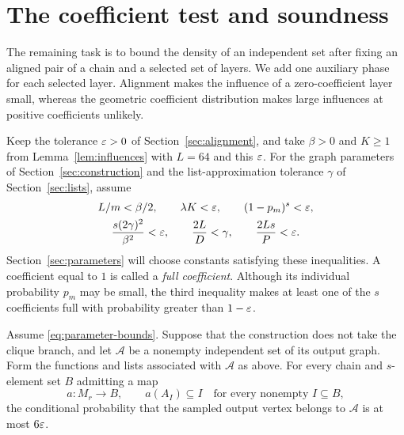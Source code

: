 \section{The coefficient test and soundness}
\label{sec:coefficient}

The remaining task is to bound the density of an independent set after
fixing an aligned pair of a chain and a selected set of layers.  We add
one auxiliary phase for each selected layer.  Alignment makes the
influence of a zero-coefficient layer small, whereas the geometric
coefficient distribution makes large influences at positive coefficients
unlikely.

Keep the tolerance $\varepsilon>0$ of Section~\ref{sec:alignment}, and take
$\beta>0$ and $K\ge1$ from
Lemma~\ref{lem:influences} with $L=64$ and this $\varepsilon$.
For the graph parameters of Section~\ref{sec:construction} and the
list-approximation tolerance $\gamma$ of Section~\ref{sec:lists}, assume
\begin{equation}\label{eq:parameter-bounds}
 \begin{gathered}
 L/m<\beta/2,\qquad \lambda K<\varepsilon,
 \qquad (1-p_m)^s<\varepsilon,\\
 \frac{s(2\gamma)^2}{\beta^2}<\varepsilon,\qquad
 \frac{2L}{D}<\gamma,\qquad \frac{2Ls}{P}<\varepsilon.
 \end{gathered}
\end{equation}
Section~\ref{sec:parameters} will choose constants satisfying these
inequalities. A coefficient equal to $1$ is called a \emph{full
coefficient}. Although its individual probability $p_m$ may be small,
the third inequality makes at least one of the $s$ coefficients full
with probability greater than $1-\varepsilon$.

\begin{proposition}\label{prop:aligned-bound}
Assume \eqref{eq:parameter-bounds}. Suppose that the construction does not
take the clique branch, and let
$\mathcal A$ be a nonempty independent set of its output graph.  Form the
functions and lists associated with $\mathcal A$ as above.  For every
chain and $s$-element set $B$ admitting a map
\[
 a:M_r\longrightarrow B,
 \qquad a(A_I)\subseteq I
 \quad\text{for every nonempty }I\subseteq B,
\]
the conditional probability that the sampled output vertex belongs to
$\mathcal A$ is at most $6\varepsilon$.
\end{proposition}

